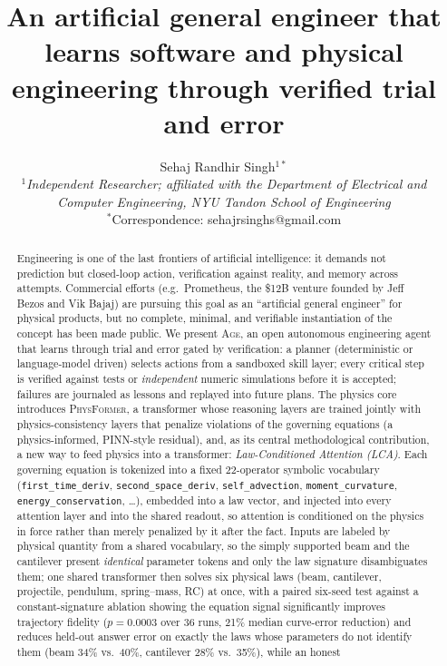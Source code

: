 \documentclass[11pt,a4paper]{article}
\title{\Large\bfseries An artificial general engineer that learns software and
physical engineering through verified trial and error}
\author{
  Sehaj Randhir Singh$^{1*}$ \\
  \small\textit{$^{1}$Independent Researcher; affiliated with the Department of
  Electrical and Computer Engineering, NYU Tandon School of Engineering}\\
  \small$^{*}$Correspondence: sehajrsinghs@gmail.com
}
\date{}
\newcommand{\Age}{\textsc{Age}}
\newcommand{\PhysFormer}{\textsc{PhysFormer}}
\begin{document}
\maketitle
\vspace{-1.2em}

\begin{abstract}
\noindent Engineering is one of the last frontiers of artificial intelligence:
it demands not prediction but closed-loop action, verification against reality,
and memory across attempts. Commercial efforts (e.g.\ Prometheus, the \$12B
venture founded by Jeff Bezos and Vik Bajaj) are pursuing this goal as an
``artificial general engineer'' for physical products, but no complete,
minimal, and verifiable instantiation of the concept has been made public. We
present \Age, an open autonomous engineering agent that learns through
trial and error gated by verification: a planner (deterministic or
language-model driven) selects actions from a sandboxed skill layer; every
critical step is verified against tests or \emph{independent} numeric
simulations before it is accepted; failures are journaled as lessons and
replayed into future plans. The physics core introduces \PhysFormer, a
transformer whose reasoning layers are trained jointly with
physics-consistency layers that penalize violations of the governing
equations (a physics-informed, PINN-style residual), and, as its central
methodological contribution, a new way to feed physics into a transformer:
\emph{Law-Conditioned Attention (LCA)}. Each governing equation is
tokenized into a fixed 22-operator symbolic vocabulary
(\texttt{first\_time\_deriv}, \texttt{second\_space\_deriv},
\texttt{self\_advection}, \texttt{moment\_curvature},
\texttt{energy\_conservation}, \ldots), embedded into a law vector, and
injected into every attention layer and into the shared readout, so
attention is conditioned on the physics in force rather than merely
penalized by it after the fact. Inputs are labeled by physical quantity
from a shared vocabulary, so the simply supported beam and the cantilever
present \emph{identical} parameter tokens and only the law signature
disambiguates them; one shared transformer then solves six physical laws
(beam, cantilever, projectile, pendulum, spring--mass, RC) at once, with a
paired six-seed test against a constant-signature ablation showing the
equation signal significantly improves trajectory fidelity
($p=0.0003$ over 36 runs, 21\% median curve-error reduction) and reduces
held-out answer error on exactly the laws whose parameters do not identify
them (beam 34\% vs.\ 40\%, cantilever 28\% vs.\ 35\%), while an honest

\end{abstract}
\end{document}
